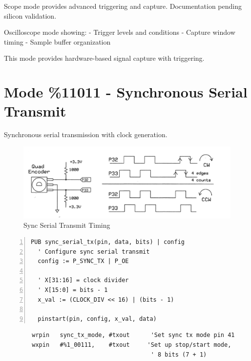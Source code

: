 \documentclass[11pt,a4paper,oneside,english]{book}
\begin{document}
Scope mode provides advanced triggering and capture. Documentation
pending silicon validation.

Oscilloscope mode showing: - Trigger levels and conditions - Capture
window timing - Sample buffer organization

This mode provides hardware-based signal capture with triggering.

\clearpage

\hypertarget{mode-11011---synchronous-serial-transmit}{%
\section{Mode \%11011 - Synchronous Serial
Transmit}\label{mode-11011---synchronous-serial-transmit}}

Synchronous serial transmission with clock generation.

\begin{figure}
\centering
\includegraphics{assets/P2 SmartPins-220809_page23_img01.png}
\caption{Sync Serial Transmit Timing}
\end{figure}

\begin{Spin2Block}
\begin{Verbatim}[numbers=left,numbersep=5pt,xleftmargin=15pt]
PUB sync_serial_tx(pin, data, bits) | config
  ' Configure sync serial transmit
  config := P_SYNC_TX | P_OE
  
  ' X[31:16] = clock divider
  ' X[15:0] = bits - 1
  x_val := (CLOCK_DIV << 16) | (bits - 1)
  
  pinstart(pin, config, x_val, data)
\end{Verbatim}
\end{Spin2Block}

\begin{PASM2Block}
\begin{lstlisting}
        wrpin   sync_tx_mode, #txout      'Set sync tx mode pin 41
        wxpin   #%1_00111,    #txout     'Set up stop/start mode,
                                          ' 8 bits (7 + 1)
\end{lstlisting}
\end{PASM2Block}
\end{document}
